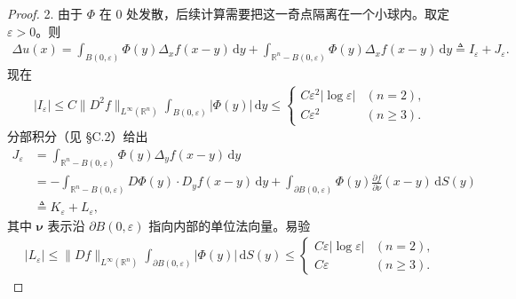 \documentclass[../../main.tex]{subfiles}
\begin{document}
\begin{proof}
2. 由于 $\Phi$ 在 $0$ 处发散，后续计算需要把这一奇点隔离在一个小球内。取定 $\varepsilon>0$。则
\begin{align}\label{align:ch02-laplace-decomp}
\Delta u(x)=\int_{B(0,\varepsilon)}\Phi(y)\Delta_x f(x-y)\,\mathrm{d}y
+\int_{\mathbb{R}^n-B(0,\varepsilon)}\Phi(y)\Delta_x f(x-y)\,\mathrm{d}y
\triangleq I_\varepsilon+J_\varepsilon.
\end{align}
现在
\begin{align}\label{align:ch02-I-eps}
|I_\varepsilon|\leqslant C\|D^2 f\|_{L^\infty(\mathbb{R}^n)}\int_{B(0,\varepsilon)}|\Phi(y)|\,\mathrm{d}y
\leqslant
\begin{cases}
C\varepsilon^2|\log\varepsilon| & (n=2),\\
C\varepsilon^2 & (n\geqslant 3).
\end{cases}
\end{align}
分部积分（见 \S C.2）给出
\begin{align}\label{align:ch02-J-eps}
J_\varepsilon&=\int_{\mathbb{R}^n-B(0,\varepsilon)}\Phi(y)\Delta_y f(x-y)\,\mathrm{d}y\\
&=-\int_{\mathbb{R}^n-B(0,\varepsilon)}D\Phi(y)\cdot D_y f(x-y)\,\mathrm{d}y
+\int_{\partial B(0,\varepsilon)}\Phi(y)\frac{\partial f}{\partial\nu}(x-y)\,\mathrm{d}S(y)\nonumber\\
&\triangleq K_\varepsilon+L_\varepsilon,\nonumber
\end{align}
其中 $\boldsymbol{\nu}$ 表示沿 $\partial B(0,\varepsilon)$ 指向内部的单位法向量。易验
\begin{align}\label{align:ch02-L-eps}
|L_\varepsilon|\leqslant \|Df\|_{L^\infty(\mathbb{R}^n)}\int_{\partial B(0,\varepsilon)}|\Phi(y)|\,\mathrm{d}S(y)
\leqslant
\begin{cases}
C\varepsilon|\log\varepsilon| & (n=2),\\
C\varepsilon & (n\geqslant 3).
\end{cases}
\end{align}


\end{proof}
\end{document}
